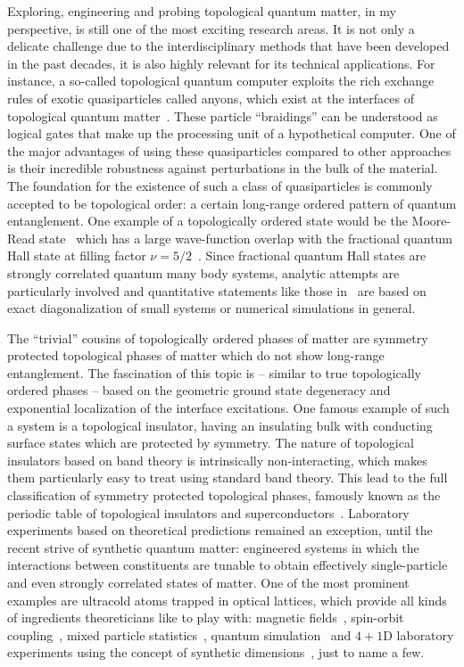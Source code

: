 Exploring, engineering and probing topological quantum matter, in my perspective, is still one of the most exciting research areas.
It is not only a delicate challenge due to the interdisciplinary methods that have been developed in the past decades, it is also highly relevant for its technical applications.
For instance, a so-called topological quantum computer exploits the rich exchange rules of exotic quasiparticles called anyons, which exist at the interfaces of topological quantum matter~\cite{Freedman2002}.
These particle ``braidings'' can be understood as logical gates that make up the processing unit of a hypothetical computer.
One of the major advantages of using these quasiparticles compared to other approaches is their incredible robustness against perturbations in the bulk of the material.
The foundation for the existence of such a class of quasiparticles is commonly accepted to be topological order: a certain long-range ordered pattern of quantum entanglement.
One example of a topologically ordered state would be the Moore-Read state~\cite{Moore1991,Read1996} which has a large wave-function overlap with the fractional quantum Hall state at filling factor $\nu=5/2$~\cite{Storni2010}.
Since fractional quantum Hall states are strongly correlated quantum many body systems, analytic attempts are particularly involved and quantitative statements like those in~\cite{Storni2010} are based on exact diagonalization of small systems or numerical simulations in general.

The ``trivial'' cousins of topologically ordered phases of matter are symmetry protected topological phases of matter which do not show long-range entanglement.
The fascination of this topic is -- similar to true topologically ordered phases -- based on the geometric ground state degeneracy and exponential localization of the interface excitations.
One famous example of such a system is a topological insulator, having an insulating bulk with conducting surface states which are protected by symmetry.
The nature of topological insulators based on band theory is intrinsically non-interacting, which makes them particularly easy to treat using standard band theory.
This lead to the full classification of symmetry protected topological phases, famously known as the periodic table of topological insulators and superconductors~\cite{Altland1997,Kitaev2009}.
Laboratory experiments based on theoretical predictions remained an exception, until the recent strive of synthetic quantum matter:
engineered systems in which the interactions between constituents are tunable to obtain effectively single-particle and even strongly correlated states of matter.
One of the most prominent examples are ultracold atoms trapped in optical lattices, which provide all kinds of ingredients theoreticians like to play with: magnetic fields~\cite{Lin2009}, spin-orbit coupling~\cite{Lin2011}, mixed particle statistics~\cite{Ferrari2002}, quantum simulation~\cite{Mazza2012} and $4+1$D laboratory experiments using the concept of synthetic dimensions~\cite{Lohse2018}, just to name a few.
%
%

